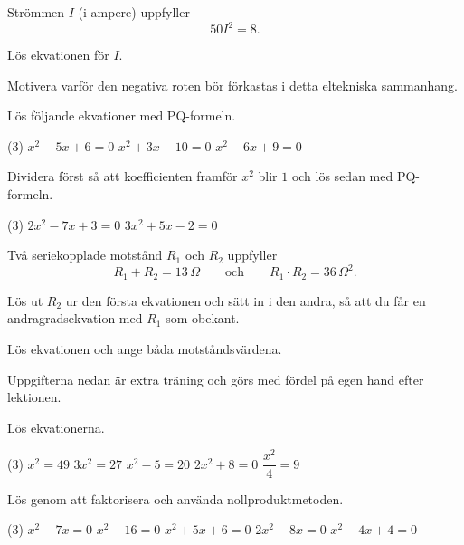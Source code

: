 Strömmen $I$ (i ampere) uppfyller
\[
  50I^2 = 8.
\]
\begin{parts}
  \item Lös ekvationen för $I$.
  \item Motivera varför den negativa roten bör förkastas i detta eltekniska sammanhang.
\end{parts}

Lös följande ekvationer med PQ-formeln.
\begin{delar}(3)
  \task $x^2 - 5x + 6 = 0$
  \task $x^2 + 3x - 10 = 0$
  \task $x^2 - 6x + 9 = 0$
\end{delar}

Dividera först så att koefficienten framför $x^2$ blir $1$ och lös sedan med PQ-formeln.
\begin{delar}(3)
  \task $2x^2 - 7x + 3 = 0$
  \task $3x^2 + 5x - 2 = 0$
\end{delar}

Två seriekopplade motstånd $R_1$ och $R_2$ uppfyller
\[
  R_1 + R_2 = 13\,\Omega \qquad \text{och} \qquad R_1 \cdot R_2 = 36\,\Omega^2.
\]
\begin{parts}
  \item Lös ut $R_2$ ur den första ekvationen och sätt in i den andra, så att du får en
    andragradsekvation med $R_1$ som obekant.
  \item Lös ekvationen och ange båda motståndsvärdena.
\end{parts}

Uppgifterna nedan är extra träning och görs med fördel på egen hand efter lektionen.

Lös ekvationerna.
\begin{delar}(3)
  \task $x^2 = 49$
  \task $3x^2 = 27$
  \task $x^2 - 5 = 20$
  \task $2x^2 + 8 = 0$
  \task $\dfrac{x^2}{4} = 9$
\end{delar}

Lös genom att faktorisera och använda nollproduktmetoden.
\begin{delar}(3)
  \task $x^2 - 7x = 0$
  \task $x^2 - 16 = 0$
  \task $x^2 + 5x + 6 = 0$
  \task $2x^2 - 8x = 0$
  \task $x^2 - 4x + 4 = 0$
\end{delar}

